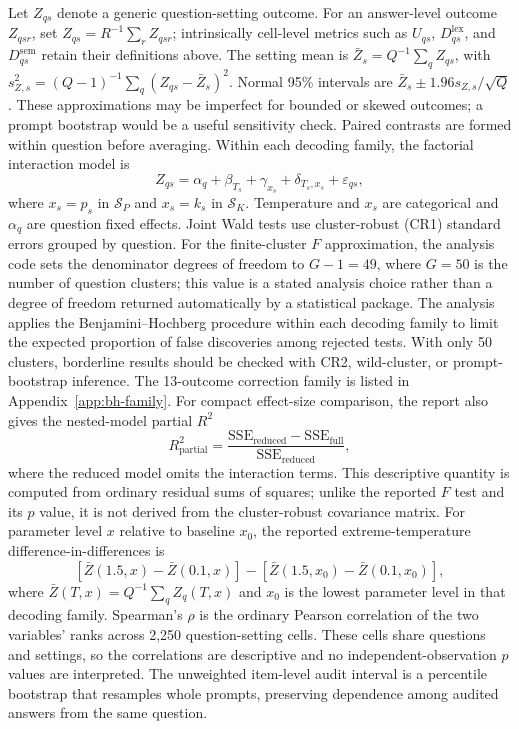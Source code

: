 \documentclass[11pt]{article}
\begin{document}
Let $Z_{qs}$ denote a generic question-setting outcome. For an answer-level
outcome $Z_{qsr}$, set $Z_{qs}=R^{-1}\sum_rZ_{qsr}$; intrinsically cell-level
metrics such as $U_{qs}$, $D^{\mathrm{lex}}_{qs}$, and
$D^{\mathrm{sem}}_{qs}$ retain their definitions above. The setting mean is
$\bar Z_s=Q^{-1}\sum_qZ_{qs}$, with
$s_{Z,s}^2=(Q-1)^{-1}\sum_q(Z_{qs}-\bar Z_s)^2$. Normal 95\% intervals
are $\bar Z_s\pm1.96s_{Z,s}/\sqrt Q$. These approximations
may be imperfect for bounded or skewed outcomes; a prompt bootstrap would be a
useful sensitivity check. Paired contrasts are
formed within question before averaging. Within each decoding family, the
factorial interaction model is
\[
 Z_{qs}=\alpha_q+\beta_{T_s}+\gamma_{x_s}
 +\delta_{T_s,x_s}+\varepsilon_{qs},
\]
where $x_s=p_s$ in $\mathcal S_P$ and $x_s=k_s$ in $\mathcal S_K$.
Temperature and $x_s$ are categorical and $\alpha_q$ are question fixed
effects. Joint Wald tests use cluster-robust (CR1) standard errors grouped by
question. For the finite-cluster $F$ approximation, the analysis code sets the
denominator degrees of freedom to $G-1=49$, where $G=50$ is the number of
question clusters; this value is a stated analysis choice rather than a degree
of freedom returned automatically by a statistical package. The analysis applies the
Benjamini--Hochberg procedure within each decoding family to limit the expected
proportion of false discoveries among rejected tests. With only 50 clusters,
borderline results should be checked with CR2, wild-cluster, or prompt-bootstrap
inference. The 13-outcome correction family is listed in
Appendix~\ref{app:bh-family}. For compact effect-size comparison, the report
also gives the nested-model partial $R^2$
\[
 R^2_{\mathrm{partial}}=
 \frac{\mathrm{SSE}_{\mathrm{reduced}}-\mathrm{SSE}_{\mathrm{full}}}
 {\mathrm{SSE}_{\mathrm{reduced}}},
\]
where the reduced model omits the interaction terms. This descriptive quantity
is computed from ordinary residual sums of squares; unlike the reported $F$
test and its $p$ value, it is not derived from the cluster-robust covariance
matrix. For parameter level $x$ relative
to baseline $x_0$, the reported
extreme-temperature difference-in-differences is
\[
 [\bar Z(1.5,x)-\bar Z(0.1,x)]-
 [\bar Z(1.5,x_0)-\bar Z(0.1,x_0)],
\]
where $\bar Z(T,x)=Q^{-1}\sum_q Z_q(T,x)$ and $x_0$ is the lowest
parameter level in that decoding family.
Spearman's $\rho$ is the ordinary Pearson correlation of the two variables'
ranks across 2,250 question-setting cells. These cells share questions and
settings, so the correlations are descriptive and no independent-observation
$p$ values are interpreted. The unweighted item-level audit interval is a
percentile bootstrap that resamples whole prompts, preserving dependence among
audited answers from the same question.
\end{document}
